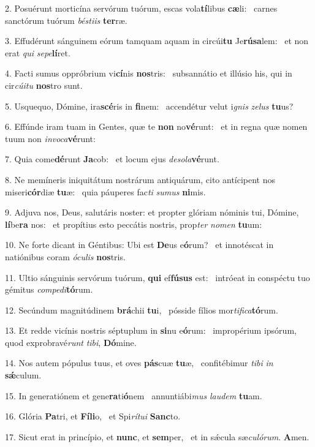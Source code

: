 2. Posuérunt morticína servórum tuórum, escas vola\textbf{tí}libus \textbf{cæ}li: \ast\  carnes sanctórum tuórum \textit{bés}\textit{ti}\textit{is} \textbf{ter}ræ.\

3. Effudérunt sánguinem eórum tamquam aquam in circúi\textbf{tu} Je\textbf{rú}\textbf{sa}lem: \ast\  et non erat \textit{qui} \textit{se}\textit{pe}\textbf{lí}ret.\

4. Facti sumus oppróbrium vi\textbf{cí}nis \textbf{nos}tris: \ast\  subsannátio et illúsio his, qui in cir\textit{cú}\textit{i}\textit{tu} \textbf{nos}tro sunt.\

5. Usquequo, Dómine, ira\textbf{scé}ris in \textbf{fi}nem: \ast\  accendétur velut i\textit{gnis} \textit{ze}\textit{lus} \textbf{tu}us?\

6. Effúnde iram tuam in Gentes, quæ te \textbf{non} no\textbf{vé}runt: \ast\  et in regna quæ nomen tuum non \textit{in}\textit{vo}\textit{ca}\textbf{vé}runt:\

7. Quia come\textbf{dé}runt \textbf{Ja}cob: \ast\  et locum ejus \textit{de}\textit{so}\textit{la}\textbf{vé}runt.\

8. Ne memíneris iniquitátum nostrárum antiquárum, cito antícipent nos miseri\textbf{cór}diæ \textbf{tu}æ: \ast\  quia páuperes fac\textit{ti} \textit{su}\textit{mus} \textbf{ni}mis.\

9. Adjuva nos, Deus, salutáris noster: et propter glóriam nóminis tui, Dómine, \textbf{lí}be\textbf{ra} nos: \ast\  et propítius esto peccátis nostris, prop\textit{ter} \textit{no}\textit{men} \textbf{tu}um:\

10. Ne forte dicant in Géntibus: Ubi est \textbf{De}us e\textbf{ó}rum? \ast\  et innotéscat in natiónibus coram \textit{ó}\textit{cu}\textit{lis} \textbf{nos}tris.\

11. Ultio sánguinis servórum tuórum, \textbf{qui} ef\textbf{fú}\textbf{sus} est: \ast\  intróeat in conspéctu tuo gémitus \textit{com}\textit{pe}\textit{di}\textbf{tó}rum.\

12. Secúndum magnitúdinem \textbf{brá}chii \textbf{tu}i, \ast\  pósside fílios mor\textit{ti}\textit{fi}\textit{ca}\textbf{tó}rum.\

13. Et redde vicínis nostris séptuplum in \textbf{si}nu e\textbf{ó}rum: \ast\  impropérium ipsórum, quod exprobravé\textit{runt} \textit{ti}\textit{bi}, \textbf{Dó}mine.\

14. Nos autem pópulus tuus, et oves \textbf{pás}cuæ \textbf{tu}æ, \ast\  confitébimur \textit{ti}\textit{bi} \textit{in} \textbf{sǽ}culum.\

15. In generatiónem et gene\textbf{ra}ti\textbf{ó}nem \ast\  annuntiábi\textit{mus} \textit{lau}\textit{dem} \textbf{tu}am.\

16. Glória \textbf{Pa}tri, et \textbf{Fí}\textbf{li}o, \ast\  et Spi\textit{rí}\textit{tu}\textit{i} \textbf{Sanc}to.\

17. Sicut erat in princípio, et \textbf{nunc}, et \textbf{sem}per, \ast\  et in sǽcula sæ\textit{cu}\textit{ló}\textit{rum}. \textbf{A}men.\

